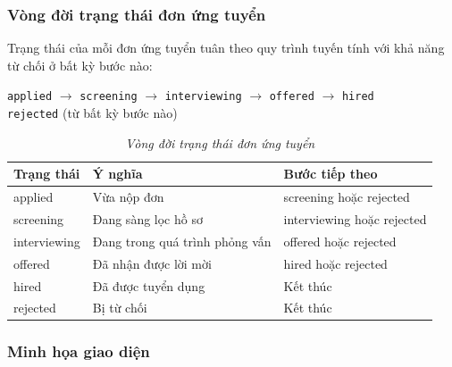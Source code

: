 \subsubsection*{Vòng đời trạng thái đơn ứng tuyển}

Trạng thái của mỗi đơn ứng tuyển tuân theo quy trình tuyến tính với khả năng từ chối ở bất kỳ bước nào:

\begin{center}
    \texttt{applied} $\to$ \texttt{screening} $\to$ \texttt{interviewing} $\to$ \texttt{offered} $\to$ \texttt{hired}\\
    \hspace{5cm} \texttt{rejected} (từ bất kỳ bước nào)
\end{center}

\begin{table}[H]
    \centering
    \renewcommand{\arraystretch}{1.3}
    \begin{tabular}{|l|l|l|}
        \hline
        \textbf{Trạng thái} & \textbf{Ý nghĩa} & \textbf{Bước tiếp theo} \\ \hline
        applied & Vừa nộp đơn & screening hoặc rejected \\ \hline
        screening & Đang sàng lọc hồ sơ & interviewing hoặc rejected \\ \hline
        interviewing & Đang trong quá trình phỏng vấn & offered hoặc rejected \\ \hline
        offered & Đã nhận được lời mời & hired hoặc rejected \\ \hline
        hired & Đã được tuyển dụng & Kết thúc \\ \hline
        rejected & Bị từ chối & Kết thúc \\ \hline
    \end{tabular}
    \caption{\textit{Vòng đời trạng thái đơn ứng tuyển}}
\end{table}

\subsubsection*{Minh họa giao diện}


